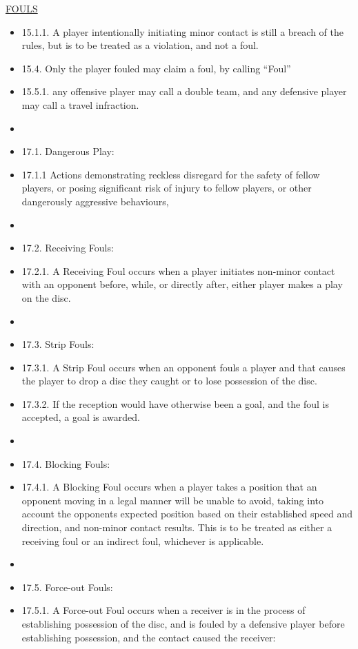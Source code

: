 \begin{center}\underline{\uppercase{fouls}}\end{center}
\begin{itemize}

    \item 15.1.1. A player intentionally initiating minor contact is still a breach of the rules, but is to be treated as a violation, and not a foul.
    \item 15.4. Only the player fouled may claim a foul, by calling “Foul”
    \item 15.5.1. any offensive player may call a double team, and any defensive player may call a travel infraction.
    \item 
    \item 17.1. Dangerous Play: 
    \item 17.1.1 Actions demonstrating reckless disregard for the safety of fellow players, or posing significant risk of injury to fellow players, or other dangerously aggressive behaviours,
    \item 
    \item 17.2. Receiving Fouls:
    \item 17.2.1. A Receiving Foul occurs when a player initiates non-minor contact with an opponent before, while, or directly after, either player makes a play on the disc.
    \item 
    \item 17.3. Strip Fouls:
    \item 17.3.1. A Strip Foul occurs when an opponent fouls a player and that causes the player to drop a disc they caught or to lose possession of the disc.
    \item 17.3.2. If the reception would have otherwise been a goal, and the foul is accepted, a goal is awarded.
    \item 
    \item 17.4. Blocking Fouls:
    \item 17.4.1. A Blocking Foul occurs when a player takes a position that an opponent moving in a legal manner will be unable to avoid, taking into account the opponents expected position based on their established speed and direction, and non-minor contact results. This is to be treated as either a receiving foul or an indirect foul, whichever is applicable.
    \item 
    \item 17.5. Force-out Fouls:
    \item 17.5.1. A Force-out Foul occurs when a receiver is in the process of establishing possession of the disc, and is fouled by a defensive player before establishing possession, and the contact caused the receiver:

\end{itemize}
